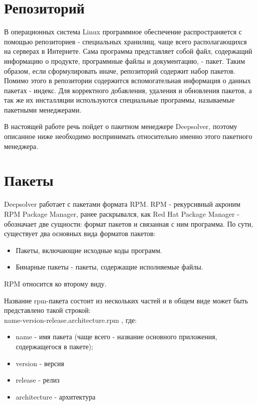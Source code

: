 ﻿\section{Репозиторий}
В операционных система Linux программное обеспечение распространяется
с помощью репозиториев - специальных хранилищ, чаще всего располагающихся
на серверах в Интернете. Сама программа представляет собой файл, содержащий
информацию о продукте, программные файлы и документацию, - пакет. Таким образом,
если сформулировать иначе, репозиторий содержит набор пакетов. Помимо этого
в репозитории содержится вспомогательная информация о данных пакетах - индекс.
Для корректного добавления, удаления и обновления пакетов, а так же их инсталляции
используются специальные программы, называемые пакетными менеджерами. 

В настоящей работе речь пойдет о пакетном менеджере Deepsolver, поэтому описанное
ниже необходимо воспринимать относительно именно этого пакетного менеджера.

\section{ Пакеты }
Deepsolver работает с пакетами формата RPM. RPM  - рекурсивный акроним RPM Package Manager,
ранее раскрывался, как Red Hat Package Manager - обозначает две сущности: формат пакетов и 
связанная с ним программа.
По сути, существует два основных вида форматов пакетов: 
\begin{itemize}
\item{Пакеты, включающие исходные коды программ.}
\item{Бинарные пакеты - пакеты, содержащие исполняемые файлы.}
\end{itemize}
RPM относится ко второму виду.

Название rpm-пакета состоит из нескольких частей и в общем виде может быть представлено
такой строкой: \\
name-version-release.architecture.rpm , где:\\
\begin{itemize}
\item{name - имя пакета (чаще всего - название основного приложения, содержащегося в пакете);}
\item{version - версия}
\item{release - релиз}
\item{architecture - архитектура}
\end{itemize}

